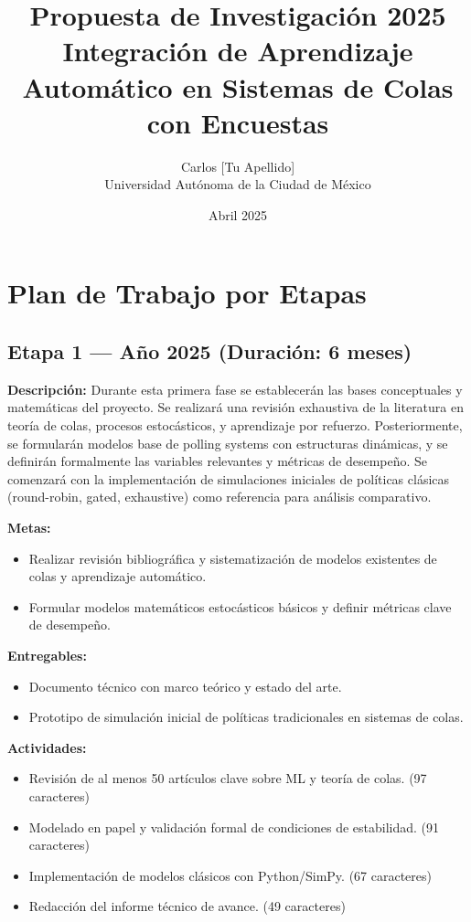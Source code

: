 \documentclass[12pt]{article}
\title{Propuesta de Investigación 2025\\Integración de Aprendizaje Automático en Sistemas de Colas con Encuestas}
\author{Carlos [Tu Apellido]\\Universidad Autónoma de la Ciudad de México}
\date{Abril 2025}
\begin{document}
\maketitle


\section*{Plan de Trabajo por Etapas}

\subsection*{Etapa 1 — Año 2025 (Duración: 6 meses)}
\textbf{Descripción:} Durante esta primera fase se establecerán las bases conceptuales y matemáticas del proyecto. Se realizará una revisión exhaustiva de la literatura en teoría de colas, procesos estocásticos, y aprendizaje por refuerzo. Posteriormente, se formularán modelos base de polling systems con estructuras dinámicas, y se definirán formalmente las variables relevantes y métricas de desempeño. Se comenzará con la implementación de simulaciones iniciales de políticas clásicas (round-robin, gated, exhaustive) como referencia para análisis comparativo.

\textbf{Metas:}
\begin{itemize}
  \item Realizar revisión bibliográfica y sistematización de modelos existentes de colas y aprendizaje automático.
  \item Formular modelos matemáticos estocásticos básicos y definir métricas clave de desempeño.
\end{itemize}

\textbf{Entregables:}
\begin{itemize}
  \item Documento técnico con marco teórico y estado del arte.
  \item Prototipo de simulación inicial de políticas tradicionales en sistemas de colas.
\end{itemize}

\textbf{Actividades:}
\begin{itemize}
  \item Revisión de al menos 50 artículos clave sobre ML y teoría de colas. (97 caracteres)
  \item Modelado en papel y validación formal de condiciones de estabilidad. (91 caracteres)
  \item Implementación de modelos clásicos con Python/SimPy. (67 caracteres)
  \item Redacción del informe técnico de avance. (49 caracteres)
\end{itemize}
\end{document}
